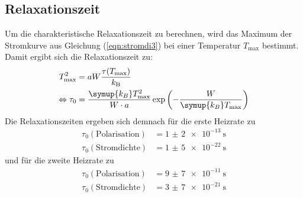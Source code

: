 \subsection{Relaxationszeit}
\label{sec:88}
Um die charakteristische Relaxationszeit zu berechnen, wird das Maximum der Stromkurve aus Gleichung (\ref{eqn:stromdi3}) bei einer Temperatur $T_\mathrm{max}$ bestimmt. Damit ergibt sich die Relaxationszeit zu:
\begin{align}
  T_\mathrm{max}^2&=aW\dfrac{\tau(T_\mathrm{max})}{k_\mathrm{B}} \notag \\
  \label{eqn:fertig}
  \Leftrightarrow \tau_\mathrm{0}&=\dfrac{\symup{k_B}T_\mathrm{max}^2}{W \cdot a} \exp\left(-\dfrac{W}{\symup{k_B}T_\mathrm{max}} \right)
\end{align}
Die Relaxationszeiten ergeben sich demnach für die erste Heizrate zu
\begin{align*}
  \tau_\mathrm{0}(\mathrm{Polarisation})&= \SI{1(2)e-13}{\second} \\
  \tau_\mathrm{0}(\mathrm{Stromdichte})&= \SI{1(5)e-22}{\second}
\end{align*}
und für die zweite Heizrate zu
\begin{align*}
  \tau_\mathrm{0}(\mathrm{Polarisation})&= \SI{9(7)e-11}{\second} \\
  \tau_\mathrm{0}(\mathrm{Stromdichte})&= \SI{3(7)e-21}{\second}
\end{align*}
